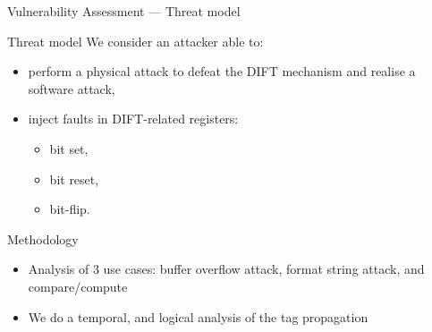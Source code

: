 \begin{frame}{Vulnerability Assessment — Threat model}
    \begin{block}{Threat model}
        We consider an attacker able to:
        \begin{itemize}
            \item perform a physical attack to defeat the DIFT mechanism and realise a software attack,
            \item inject faults in DIFT-related registers:
                  \begin{itemize}
                      \item bit set,
                      \item bit reset,
                      \item bit-flip.
                  \end{itemize}
        \end{itemize}
        \vspace{-15pt}
    \end{block}

    \begin{block}{Methodology}
        \begin{itemize}
            \item Analysis of 3 use cases: buffer overflow attack, format string attack, and compare/compute
            \item We do a temporal, and logical analysis of the tag propagation
        \end{itemize}
    \end{block}

\end{frame}
